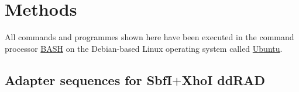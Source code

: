 \documentclass[a4paper,12pt,times,authoryear,twoside,print,index]{Classes/PhDThesisPSnPDF}\usepackage[]{graphicx}\usepackage[]{color}
\begin{document}
%


\section{Methods}

All commands and programmes shown here have been executed in the command processor \href{http://en.wikipedia.org/wiki/Bash_%28Unix_shell%29}{BASH} on the  Debian-based Linux operating system called \href{http://en.wikipedia.org/wiki/Ubuntu_%28operating_system%29}{Ubuntu}.

\subsection{Adapter sequences for SbfI$+$XhoI ddRAD}\label{ch:adapter_sequences}
\end{document}
